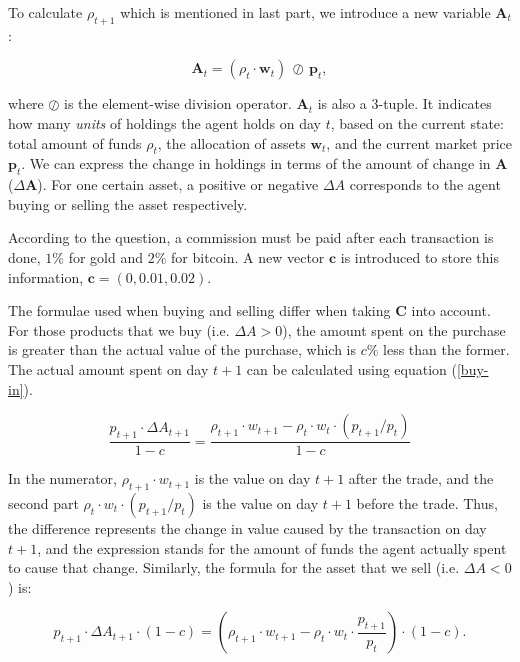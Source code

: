 \documentclass{mcmthesis}
\begin{document}
To calculate $\rho _{t+1}$ which is mentioned in last part,
we introduce a new variable $\pmb{A}_t$:

\begin{equation}
  \pmb{A}_t = (\rho _t \cdot \pmb{w}_t) \, \oslash \, \pmb{p}_t ,
\end{equation}

where $\oslash$ is the element-wise division operator.
$\pmb{A}_t$ is also a 3-tuple.
It indicates how many \textit{units} of holdings the agent holds on day $t$,
based on the current state:
total amount of funds $\rho_t$, the allocation of assets $\pmb{w}_t$,
and the current market price $\pmb{p}_t$.
We can express the change in holdings in terms of the amount of change in $\pmb{A}$ ($\Delta \pmb{A}$).
For one certain asset,
a positive or negative $\Delta A$ corresponds to the agent buying or selling the asset respectively.

According to the question, a commission must be paid after each transaction is done,
$1\%$ for gold and $2\%$ for bitcoin.
A new vector $\pmb{c}$ is introduced to store this information,
$\pmb{c} = (0, 0.01, 0.02)$.

The formulae used when buying and selling differ when taking $\pmb{C}$ into account.
For those products that we buy (i.e. $\Delta A > 0$),
the amount spent on the purchase is greater than the actual value of the purchase,
which is $c\%$ less than the former.
The actual amount spent on day $t+1$ can be calculated using equation (\ref{buy-in}).

\begin{equation}
  \frac{p_{t+1} \cdot \Delta A_{t+1}}{1-c}
  = \frac{\rho _{t+1} \cdot w_{t+1} - \rho _t \cdot w_t \cdot (p_{t+1} / p_t)}{1-c}
  \label{buy-in}
\end{equation}

In the numerator,
$\rho _{t+1} \cdot w_{t+1}$ is the value on day $t+1$ after the trade,
and the second part $\rho _t \cdot w_t \cdot (p_{t+1} / p_t)$
is the value on day $t+1$ before the trade.
Thus, the difference represents the change in value caused by the transaction on day $t+1$,
and the expression stands for the amount of funds the agent actually spent
to cause that change.
Similarly, the formula for the asset that we sell (i.e. $\Delta A < 0$) is:

\begin{equation}
  p_{t+1} \cdot \Delta A_{t+1} \cdot (1 - c)
  = (\rho _{t+1} \cdot w_{t+1} - \rho _t \cdot w_t \cdot \frac{p_{t+1}}{p_t}) \cdot (1-c).
\end{equation}
\end{document}
